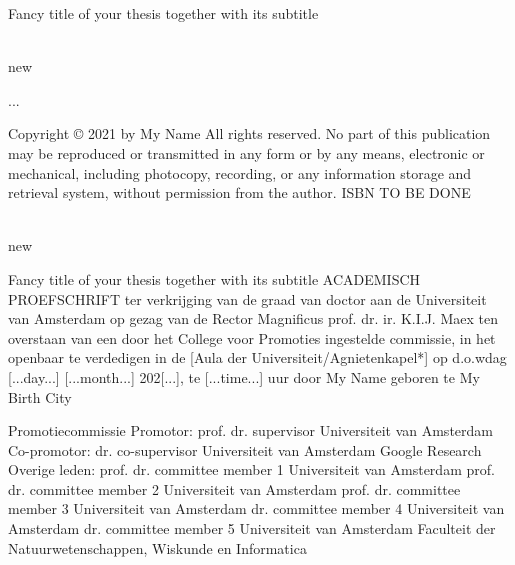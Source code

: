 Fancy title of your thesis
together with its subtitle

\\new

...

Copyright © 2021 by My Name
All rights reserved. No part of this publication may be reproduced or transmitted in any form or by
any means, electronic or mechanical, including photocopy, recording, or any information storage
and retrieval system, without permission from the author.
ISBN TO BE DONE

\\new

Fancy title of your thesis
together with its subtitle
ACADEMISCH PROEFSCHRIFT
ter verkrijging van de graad van doctor
aan de Universiteit van Amsterdam
op gezag van de Rector Magnificus
prof. dr. ir. K.I.J. Maex
ten overstaan van een door het College voor Promoties ingestelde commissie,
in het openbaar te verdedigen in de [Aula der Universiteit/Agnietenkapel*]
op d.o.wdag [...day...] [...month...] 202[...], te [...time...] uur
door
My Name
geboren te My Birth City


\newpageorsommat


Promotiecommissie
Promotor: prof. dr. supervisor Universiteit van Amsterdam
Co-promotor: dr. co-supervisor Universiteit van Amsterdam
Google Research
Overige leden: prof. dr. committee member 1 Universiteit van Amsterdam
prof. dr. committee member 2 Universiteit van Amsterdam
prof. dr. committee member 3 Universiteit van Amsterdam
dr. committee member 4 Universiteit van Amsterdam
dr. committee member 5 Universiteit van Amsterdam
Faculteit der Natuurwetenschappen, Wiskunde en Informatica

